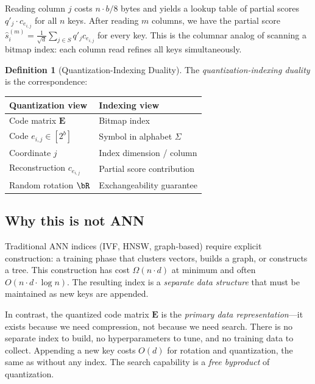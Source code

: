 \documentclass[10pt,twocolumn]{article}
\theoremstyle{definition}
\newtheorem{definition}[theorem]{Definition}
\begin{document}
Reading column $j$ costs $n \cdot b / 8$ bytes and yields a lookup table of
partial scores $q'_j \cdot c_{e_{i,j}}$ for all $n$ keys.  After reading $m$
columns, we have the partial score $\hat{s}_i^{(m)} = \frac{1}{\sqrt{d}}
\sum_{j \in S} q'_j c_{e_{i,j}}$ for every key.  This is the columnar
analog of scanning a bitmap index: each column read refines all keys
simultaneously.

\begin{definition}[Quantization-Indexing Duality]
  \label{def:duality}
  The \emph{quantization-indexing duality} is the correspondence:
  \begin{center}
  \begin{tabular}{ll}
    \toprule
    \textbf{Quantization view} & \textbf{Indexing view} \\
    \midrule
    Code matrix $\mathbf{E}$ & Bitmap index \\
    Code $e_{i,j} \in [2^b]$ & Symbol in alphabet $\Sigma$ \\
    Coordinate $j$ & Index dimension / column \\
    Reconstruction $c_{e_{i,j}}$ & Partial score contribution \\
    Random rotation $\bR$ & Exchangeability guarantee \\
    \bottomrule
  \end{tabular}
  \end{center}
\end{definition}

\subsection{Why this is not ANN}

Traditional ANN indices (IVF, HNSW, graph-based) require explicit construction:
a training phase that clusters vectors, builds a graph, or constructs a tree.
This construction has cost $\Omega(n \cdot d)$ at minimum and often
$O(n \cdot d \cdot \log n)$.  The resulting index is a \emph{separate data
structure} that must be maintained as new keys are appended.

In contrast, the quantized code matrix $\mathbf{E}$ is the \emph{primary data
representation}---it exists because we need compression, not because we need
search.  There is no separate index to build, no hyperparameters to tune, and no
training data to collect.  Appending a new key costs $O(d)$ for rotation and
quantization, the same as without any index.  The search capability is a
\emph{free byproduct} of quantization.
\end{document}

